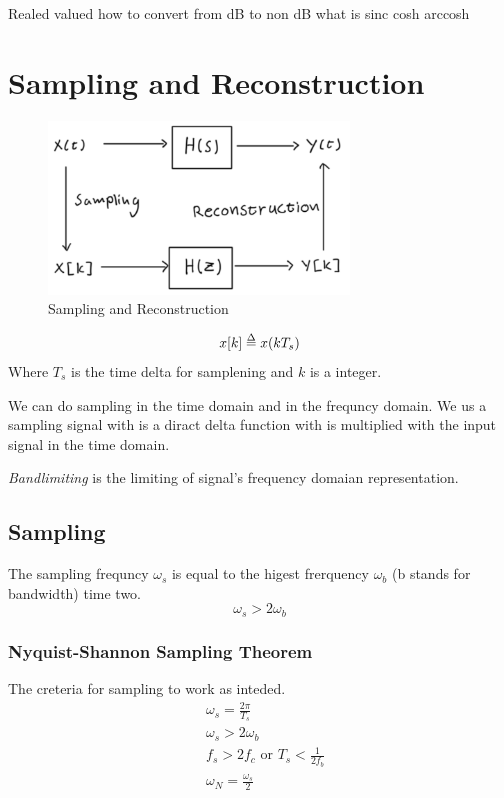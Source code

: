 \begin{multicols}{2}


Realed valued
how to convert from dB to non dB
what is sinc cosh arccosh


\section{Sampling and Reconstruction}
\begin{figure}[H]
    \centering
    \includegraphics[width=8cm]{image/sampling_and_reconstruction.pdf}
    \caption{Sampling and Reconstruction}
    \label{fig:sampling_and_reconstruction}
\end{figure}

\begin{equation*}
    x[k] \delequal x(k T_s)
\end{equation*}
Where $T_s$ is the time delta for samplening and $k$ is a integer. \newline

We can do sampling in the time domain and in the frequncy domain. 
We us a sampling signal with is a diract delta function with is multiplied with 
the input signal in the time domain.

\noindent\textit{Bandlimiting} is the limiting of signal's frequency domaian representation.

\subsection{Sampling}
The sampling frequncy $\omega_s$ is equal to the higest frerquency $\omega_b$ (b stands for bandwidth)
time two.
\begin{equation*}
    \omega_s > 2\omega_b    
\end{equation*}

\subsubsection{Nyquist-Shannon Sampling Theorem}
The creteria for sampling to work as inteded.
\begin{align*}
    &\omega_s =\frac{2\pi}{T_s} \\
    &\omega_s > 2\omega_b \\
    &f_s > 2f_c \text{ or } T_s < \frac{1}{2f_b} \\
    &\omega_N = \frac{\omega_s}{2}
\end{align*}



\end{multicols}
